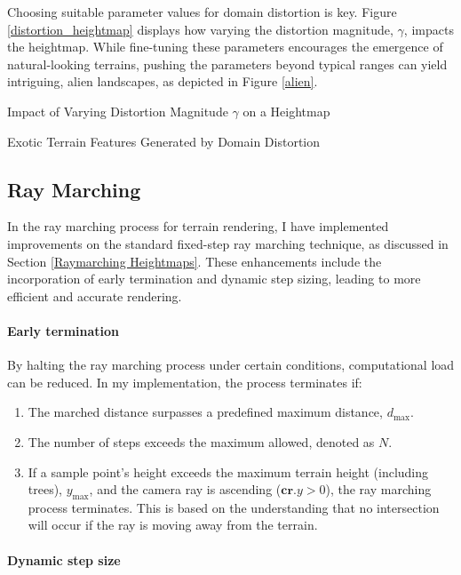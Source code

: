 Choosing suitable parameter values for domain distortion is key. Figure \ref{distortion_heightmap} displays how varying the distortion magnitude, $\gamma$, impacts the heightmap. While fine-tuning these parameters encourages the emergence of natural-looking terrains, pushing the parameters beyond typical ranges can yield intriguing, alien landscapes, as depicted in Figure \ref{alien}.

{Impact of Varying Distortion Magnitude $\gamma$ on a Heightmap}

{Exotic Terrain Features Generated by Domain Distortion}

\subsection{Ray Marching}
\label{Terrain Raymarching}

In the ray marching process for terrain rendering, I have implemented improvements on the standard fixed-step ray marching technique, as discussed in Section \ref{Raymarching Heightmaps}. These enhancements include the incorporation of early termination and dynamic step sizing, leading to more efficient and accurate rendering.

\paragraph{Early termination}

By halting the ray marching process under certain conditions, computational load can be reduced. In my implementation, the process terminates if:

\begin{enumerate}
    \item The marched distance surpasses a predefined maximum distance, $d_{\text{max}}$.
    \item The number of steps exceeds the maximum allowed, denoted as $N$.
    \item If a sample point's height exceeds the maximum terrain height (including trees), $y_{\text{max}}$, and the camera ray is ascending ($\mathbf{cr}.y > 0$), the ray marching process terminates. This is based on the understanding that no intersection will occur if the ray is moving away from the terrain.
\end{enumerate}

\paragraph{Dynamic step size}

